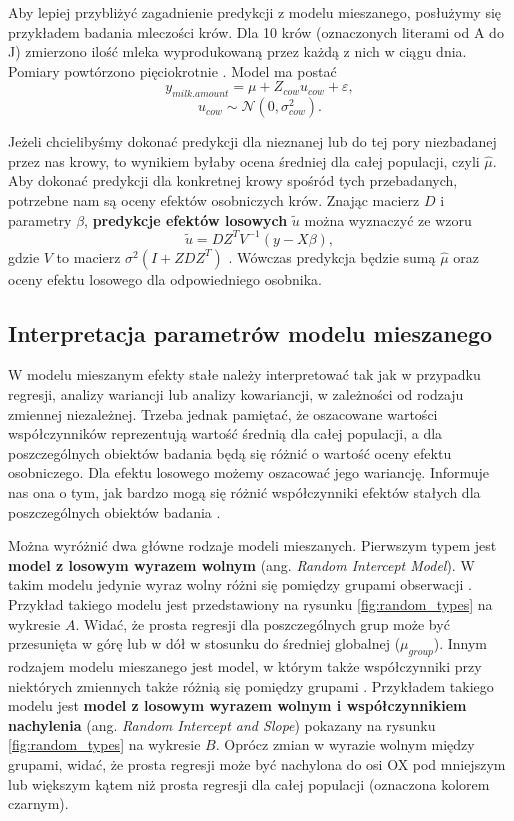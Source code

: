 \documentclass[12pt]{mwbk}
\theoremstyle{plain}
\theoremstyle{definition}
\theoremstyle{definition}
\begin{document}
 Aby lepiej przybliżyć zagadnienie predykcji z modelu mieszanego, posłużymy się przykładem badania mleczości krów. Dla 10 krów (oznaczonych literami od A do J) zmierzono ilość mleka wyprodukowaną przez każdą z nich w ciągu dnia. Pomiary powtórzono pięciokrotnie \cite{biecek}.
Model ma postać 
$$y_{milk.amount}=\mu+Z_{cow}u_{cow}+\varepsilon,$$
$$u_{cow} \sim \mathcal{N}(0, \sigma^2_{cow}).$$

Jeżeli chcielibyśmy dokonać predykcji dla nieznanej lub do tej pory niezbadanej przez nas krowy, to wynikiem byłaby ocena średniej dla całej populacji, czyli $\hat{\mu}$.
Aby dokonać predykcji dla konkretnej krowy spośród tych przebadanych, potrzebne nam są oceny efektów osobniczych krów.
Znając macierz $D$ i parametry $\beta$, \textbf{predykcje efektów losowych} $\widetilde{u}$ można wyznaczyć ze wzoru
$$\widetilde{u}=DZ^TV^{-1}(y-X\beta),$$
gdzie $V$ to macierz $\sigma^2(I+ZDZ^T)$ \cite{biecek}. Wówczas predykcja będzie sumą $\hat{\mu}$ oraz oceny efektu losowego dla odpowiedniego osobnika.

 
 
 
 
 \subsection{Interpretacja parametrów modelu mieszanego}
 W modelu mieszanym efekty stałe należy interpretować tak jak w przypadku regresji, analizy wariancji lub analizy kowariancji, w zależności od rodzaju zmiennej niezależnej. Trzeba jednak pamiętać, że oszacowane wartości współczynników reprezentują wartość średnią dla całej populacji, a dla poszczególnych obiektów badania będą się różnić o wartość oceny efektu osobniczego.
 Dla efektu losowego możemy oszacować jego wariancję. Informuje nas ona o tym, jak bardzo mogą się różnić współczynniki efektów stałych dla poszczególnych obiektów badania
 \cite{experimental}.
 
 Można wyróżnić dwa główne rodzaje modeli mieszanych. Pierwszym typem jest \textbf{model z losowym wyrazem wolnym} (ang. \textit{Random Intercept Model}). W takim modelu jedynie wyraz wolny różni się pomiędzy grupami obserwacji \cite{insurance}. Przykład takiego modelu jest przedstawiony na rysunku \ref{fig:random_types} na wykresie $A$. Widać, że prosta regresji dla poszczególnych grup może być przesunięta w górę lub w dół w stosunku do średniej globalnej ($\mu_{group}$). 
 Innym rodzajem modelu mieszanego jest model, w którym także współczynniki przy niektórych zmiennych także różnią się pomiędzy grupami \cite{insurance}. Przykładem takiego modelu jest \textbf{model z losowym wyrazem wolnym i współczynnikiem nachylenia} (ang. \textit{Random Intercept and Slope}) pokazany na rysunku \ref{fig:random_types} na wykresie $B$. Oprócz zmian w wyrazie wolnym między grupami, widać, że prosta regresji może być nachylona do osi OX pod mniejszym lub większym kątem niż prosta regresji dla całej populacji (oznaczona kolorem czarnym).
 
\end{document}
